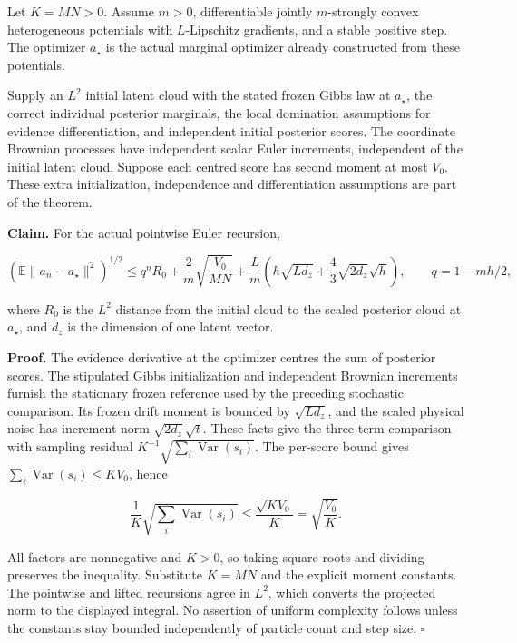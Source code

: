 \documentclass[11pt,a4paper]{report}
\begin{document}
Let \(K=MN>0\). Assume \(m>0\), differentiable jointly \(m\)-strongly convex heterogeneous potentials with \(L\)-Lipschitz gradients, and a stable positive step. The optimizer \(a_\star\) is the actual marginal optimizer already constructed from these potentials.




Supply an \(L^2\) initial latent cloud with the stated frozen Gibbs law at \(a_\star\), the correct individual posterior marginals, the local domination assumptions for evidence differentiation, and independent initial posterior scores. The coordinate Brownian processes have independent scalar Euler increments, independent of the initial latent cloud. Suppose each centred score has second moment at most \(V_0\). These extra initialization, independence and differentiation assumptions are part of the theorem.



\textbf{Claim.} For the actual pointwise Euler recursion,

\[\left(\mathbb E\|a_n-a_\star\|^2\right)^{1/2}\le q^nR_0+\frac2m\sqrt{\frac{V_0}{MN}}+\frac Lm\left(h\sqrt{L d_z}+\frac43\sqrt{2d_z}\sqrt h\right),\qquad q=1-mh/2,\]

where \(R_0\) is the \(L^2\) distance from the initial cloud to the scaled posterior cloud at \(a_\star\), and \(d_z\) is the dimension of one latent vector.



\textbf{Proof.} The evidence derivative at the optimizer centres the sum of posterior scores. The stipulated Gibbs initialization and independent Brownian increments furnish the stationary frozen reference used by the preceding stochastic comparison. Its frozen drift moment is bounded by \(\sqrt{Ld_z}\), and the scaled physical noise has increment norm \(\sqrt{2d_z}\sqrt t\). These facts give the three-term comparison with sampling residual \(K^{-1}\sqrt{\sum_i\operatorname{Var}(s_i)}\). The per-score bound gives \(\sum_i\operatorname{Var}(s_i)\le KV_0\), hence

\[\frac1K\sqrt{\sum_i\operatorname{Var}(s_i)}\le\frac{\sqrt{KV_0}}K=\sqrt{\frac{V_0}K}.\]

All factors are nonnegative and \(K>0\), so taking square roots and dividing preserves the inequality. Substitute \(K=MN\) and the explicit moment constants. The pointwise and lifted recursions agree in \(L^2\), which converts the projected norm to the displayed integral. No assertion of uniform complexity follows unless the constants stay bounded independently of particle count and step size. \(\square\)
\end{document}

